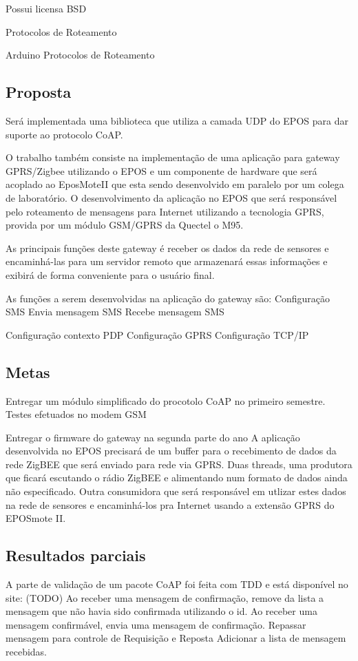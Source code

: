 Possui licensa BSD

Protocolos de Roteamento
  
Arduino Protocolos de Roteamento


\subsection{Proposta}
Ser\'a implementada uma biblioteca que utiliza a camada UDP do EPOS para dar suporte ao protocolo CoAP.

O trabalho tamb\'em consiste na implementa\c{c}\~ao de uma aplica\c{c}\~ao para gateway GPRS/Zigbee utilizando o EPOS e um componente de hardware que ser\'a acoplado ao EposMoteII que esta sendo desenvolvido em paralelo por um colega de laborat\'orio. O desenvolvimento da aplica\c{c}\~ao no EPOS que ser\'a respons\'avel pelo roteamento de mensagens para Internet utilizando a tecnologia GPRS, provida por um m\'odulo GSM/GPRS da Quectel o M95.

As principais fun\c{c}\~oes deste gateway \'e receber os dados da rede de sensores e encaminh\'a-las para um servidor remoto que armazenar\'a essas informa\c{c}\~oes e exibir\'a de forma conveniente para o usu\'ario final.

As fun\c{c}\~oes a serem desenvolvidas na aplica\c{c}\~ao do gateway s\~ao:
Configura\c{c}\~ao SMS
Envia mensagem SMS
Recebe mensagem SMS

Configura\c{c}\~ao contexto PDP
Configura\c{c}\~ao GPRS
Configura\c{c}\~ao TCP/IP

\subsection{Metas}
Entregar um m\'odulo simplificado do procotolo CoAP no primeiro semestre.
Testes efetuados no modem GSM

Entregar o firmware do gateway na segunda parte do ano A aplica\c{c}\~ao desenvolvida no EPOS precisar\'a de um buffer para o recebimento de dados da rede ZigBEE que ser\'a enviado para rede via GPRS.
Duas threads, uma produtora que ficar\'a escutando o r\'adio ZigBEE e alimentando num formato de dados ainda n\~ao especificado. Outra consumidora que ser\'a respons\'avel em utlizar estes dados na rede de sensores e encaminh\'a-los pra Internet usando a extens\~ao GPRS do EPOSmote II.

\subsection{Resultados parciais}
A parte de valida\c{c}\~ao de um pacote CoAP foi feita com TDD e est\'a dispon\'ivel no site: (TODO)
Ao receber uma mensagem de confirma\c{c}\~ao, remove da lista a mensagem que n\~ao havia sido confirmada utilizando o id.
Ao receber uma mensagem confirm\'avel, envia uma mensagem de confirma\c{c}\~ao.
Repassar mensagem para controle de Requisi\c{c}\~ao e Reposta Adicionar a lista de mensagem recebidas.

